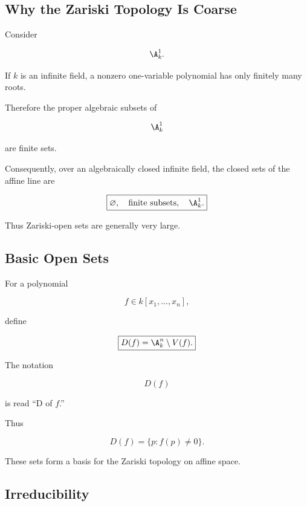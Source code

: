 \subsection{Why the Zariski Topology Is Coarse}
\label{subsec:zariski-coarse}

Consider

\[
\A^1_k.
\]

If \(k\) is an infinite field, a nonzero one-variable polynomial has only
finitely many roots.

Therefore the proper algebraic subsets of

\[
\A^1_k
\]

are finite sets.

Consequently, over an algebraically closed infinite field, the closed sets
of the affine line are

\[
\boxed{
\varnothing,
\quad
\text{finite subsets},
\quad
\A^1_k.
}
\]

Thus Zariski-open sets are generally very large.

\subsection{Basic Open Sets}
\label{subsec:basic-open-sets}

For a polynomial

\[
f\in k[x_1,\ldots,x_n],
\]

define

\[
\boxed{
D(f)
=
\A^n_k\setminus V(f).
}
\]

The notation

\[
D(f)
\]

is read ``D of \(f\).''

Thus

\[
D(f)
=
\{
p:f(p)\neq0
\}.
\]

These sets form a basis for the Zariski topology on affine space.

\subsection{Irreducibility}
\label{subsec:algebraic-irreducibility}

